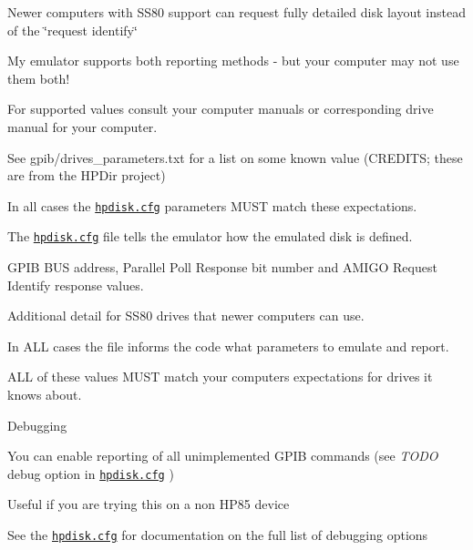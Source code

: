 \begin{DoxyItemize}
\begin{DoxyItemize}
\begin{DoxyItemize}
\begin{DoxyItemize}
\end{DoxyItemize}
\end{DoxyItemize}
\item Newer computers with S\+S80 support can request fully detailed disk layout instead of the \char`\"{}request identify\char`\"{}
\item My emulator supports both reporting methods -\/ but your computer may not use them both!
\begin{DoxyItemize}
\item For supported values consult your computer manuals or corresponding drive manual for your computer.
\begin{DoxyItemize}
\item See gpib/drives\+\_\+parameters.\+txt for a list on some known value (C\+R\+E\+D\+I\+TS; these are from the H\+P\+Dir project)
\end{DoxyItemize}
\item In all cases the \href{sdcard/hpdisk.cfg}{\tt hpdisk.\+cfg} parameters M\+U\+ST match these expectations.
\end{DoxyItemize}
\item The \href{sdcard/hpdisk.cfg}{\tt hpdisk.\+cfg} file tells the emulator how the emulated disk is defined.
\begin{DoxyItemize}
\item G\+P\+IB B\+US address, Parallel Poll Response bit number and A\+M\+I\+GO Request Identify response values.
\item Additional detail for S\+S80 drives that newer computers can use.
\item In A\+LL cases the file informs the code what parameters to emulate and report.
\begin{DoxyItemize}
\item A\+LL of these values M\+U\+ST match your computers expectations for drives it knows about.
\end{DoxyItemize}
\end{DoxyItemize}
\item Debugging
\begin{DoxyItemize}
\item You can enable reporting of all unimplemented G\+P\+IB commands (see {\itshape T\+O\+DO} debug option in \href{sdcard/hpdisk.cfg}{\tt hpdisk.\+cfg} )
\begin{DoxyItemize}
\item Useful if you are trying this on a non H\+P85 device
\item See the \href{sdcard/hpdisk.cfg}{\tt hpdisk.\+cfg} for documentation on the full list of debugging options

\end{DoxyItemize}
\end{DoxyItemize}
\end{DoxyItemize}
\end{DoxyItemize}
